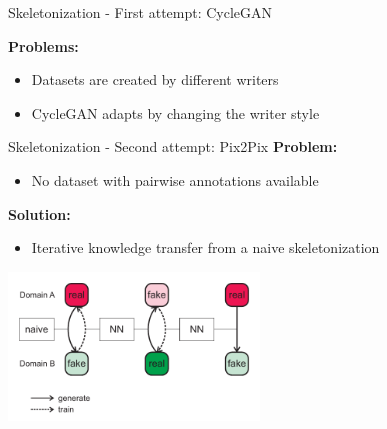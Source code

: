 \documentclass[aspectratio=169]{beamer}
\begin{document}
\begin{frame}{Skeletonization - First attempt: CycleGAN}
\vspace{-1em}
\begin{figure}[H]
\end{figure}
\vspace{1em}
\textbf{Problems:}
\begin{itemize}
\item Datasets are created by different writers
\item CycleGAN adapts by changing the writer style
\end{itemize}
\end{frame}



\begin{frame}{Skeletonization - Second attempt: Pix2Pix}
\textbf{Problem:}
\begin{itemize}
\item No dataset with pairwise annotations available
\end{itemize}
\textbf{Solution:}
\begin{itemize}
\item Iterative knowledge transfer from a naive skeletonization
\end{itemize}
\begin{center}
\includegraphics[width=0.5\textwidth]{assets/pix2pixTransfer.pdf}\hspace{5em}~
\end{center}
\end{frame}
\end{document}
